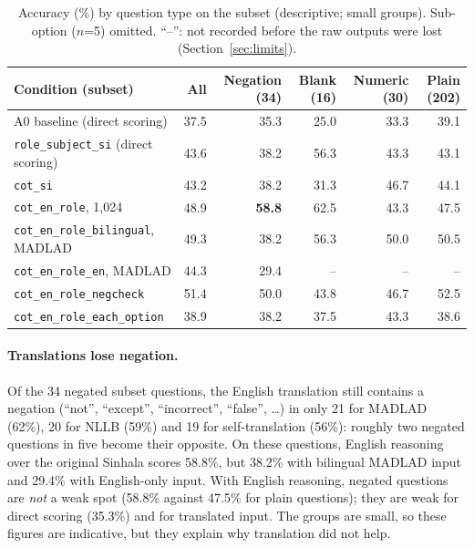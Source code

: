 \documentclass[10pt,a4paper]{article}
\newcommand{\cond}[1]{\texttt{#1}}
\begin{document}
\begin{table}[h]
\centering\footnotesize\setlength{\tabcolsep}{4pt}
\begin{tabular}{lrrrrr}
\toprule
Condition (subset) & All & Negation (34) & Blank (16) & Numeric (30) & Plain (202)\\
\midrule
A0 baseline (direct scoring) & 37.5 & 35.3 & 25.0 & 33.3 & 39.1\\
\cond{role\_subject\_si} (direct scoring) & 43.6 & 38.2 & 56.3 & 43.3 & 43.1\\
\cond{cot\_si} & 43.2 & 38.2 & 31.3 & 46.7 & 44.1\\
\cond{cot\_en\_role}, 1,024 & 48.9 & \textbf{58.8} & 62.5 & 43.3 & 47.5\\
\cond{cot\_en\_role\_bilingual}, MADLAD & 49.3 & 38.2 & 56.3 & 50.0 & 50.5\\
\cond{cot\_en\_role\_en}, MADLAD & 44.3 & 29.4 & -- & -- & --\\
\cond{cot\_en\_role\_negcheck} & 51.4 & 50.0 & 43.8 & 46.7 & 52.5\\
\cond{cot\_en\_role\_each\_option} & 38.9 & 38.2 & 37.5 & 43.3 & 38.6\\
\bottomrule
\end{tabular}
\caption{Accuracy (\%) by question type on the subset (descriptive; small groups). Sub-option ($n$=5) omitted.
``--'': not recorded before the raw outputs were lost (Section~\ref{sec:limits}).}
\label{tab:qtypes}
\end{table}

\paragraph{Translations lose negation.} Of the 34 negated subset questions, the English translation still contains a
negation (``not'', ``except'', ``incorrect'', ``false'', \ldots) in only 21 for MADLAD (62\%), 20 for NLLB (59\%) and
19 for self-translation (56\%): roughly two negated questions in five become their opposite. On these questions,
English reasoning over the original Sinhala scores 58.8\%, but 38.2\% with bilingual MADLAD input and 29.4\% with
English-only input. With English reasoning, negated questions are \emph{not} a weak spot (58.8\% against 47.5\% for
plain questions); they are weak for direct scoring (35.3\%) and for translated input. The groups are small, so these
figures are indicative, but they explain why translation did not help.
\end{document}
